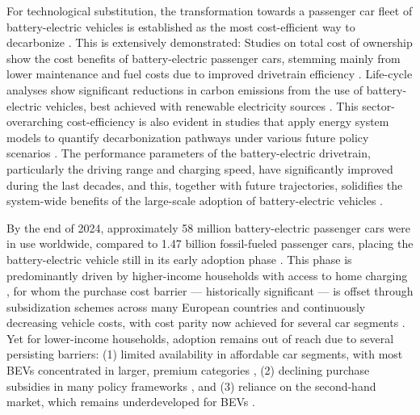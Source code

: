         For technological substitution, the transformation towards a passenger car fleet of battery-electric vehicles is established as the most cost-efficient way to decarbonize \cite{Edelenbosch2017DecomposingTransport}. This is extensively demonstrated: Studies on total cost of ownership show the cost benefits of battery-electric passenger cars, stemming mainly from lower maintenance and fuel costs due to improved drivetrain efficiency \cite{BAUER2025125764}. Life-cycle analyses show significant reductions in carbon emissions from the use of battery-electric vehicles, best achieved with renewable electricity sources \cite{ROSENFELD2019117879}. This sector-overarching cost-efficiency is also evident in studies that apply energy system models to quantify decarbonization pathways under various future policy scenarios \cite{KORKMAZ2021100707}. The performance parameters of the battery-electric drivetrain, particularly the driving range and charging speed, have significantly improved during the last decades, and this, together with future trajectories, solidifies the system-wide benefits of the large-scale adoption of battery-electric vehicles \cite{IEA2022outlook}.

        By the end of 2024, approximately 58 million battery-electric passenger cars were in use worldwide, compared to 1.47 billion fossil-fueled passenger cars, placing the battery-electric vehicle still in its early adoption phase \cite{IEA2025GlobalEVOutlook}. This phase is predominantly driven by higher-income households with access to home charging \cite{BRUCKMANN2021102615}, for whom the purchase cost barrier — historically significant \cite{BERKELEY2017320} — is offset through subsidization schemes across many European countries \cite{Wappelhorst2020} and continuously decreasing vehicle costs, with cost parity now achieved for several car segments \cite{IEA2025GlobalEVOutlook}. Yet for lower-income households, adoption remains out of reach due to several persisting barriers: (1) limited availability in affordable car segments, with most \acp{BEV} concentrated in larger, premium categories \citep{IEA2024outlook}, (2) declining purchase subsidies in many policy frameworks \citep{IEA2025GlobalEVOutlook}, and (3) reliance on the second-hand market, which remains underdeveloped for \acp{BEV} \citep{KLEIN2023100787,pedrosa2018}.

        

